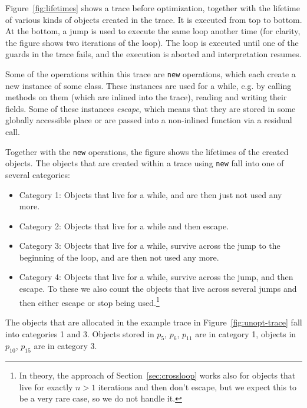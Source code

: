\documentclass{sigplanconf}
\begin{document}
Figure~\ref{fig:lifetimes} shows a trace before optimization, together with the
lifetime of various kinds of objects created in the trace. It is executed from
top to bottom. At the bottom, a jump is used to execute the same loop another
time (for clarity, the figure shows two iterations of the loop). The loop is
executed until one of the guards in the trace fails, and the execution is
aborted and interpretation resumes.

Some of the operations within this trace are \texttt{new} operations, which each
create a new instance of some class. These instances are used for a while, e.g.
by calling methods on them (which are inlined into the trace), reading and
writing their fields. Some of these instances \emph{escape}, which means that
they are stored in some globally accessible place or are passed into a
non-inlined function via a residual call.

Together with the \texttt{new} operations, the figure shows the lifetimes of the
created objects. The objects that are created within a trace using \texttt{new}
fall into one of several categories:

\begin{itemize}
    \item Category 1: Objects that live for a while, and are then just not
    used any more.

    \item Category 2: Objects that live for a while and then escape.

    \item Category 3: Objects that live for a while, survive across the jump to
    the beginning of the loop, and are then not used any more.

    \item Category 4: Objects that live for a while, survive across the jump,
    and then escape. To these we also count the objects that live across several
    jumps and then either escape or stop being used.\footnote{In theory, the
    approach of Section~\ref{sec:crossloop} works also for objects that live for
    exactly $n>1$ iterations and then don't escape, but we expect this to be a
    very rare case, so we do not handle it.}
\end{itemize}

The objects that are allocated in the example trace in
Figure~\ref{fig:unopt-trace} fall into categories 1 and 3. Objects stored in
$p_{5}$, $p_{6}$, $p_{11}$ are in category 1, objects in $p_{10}$, $p_{15}$ are in
category 3.
\end{document}
